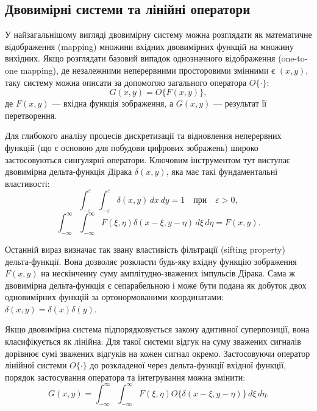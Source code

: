 \subsection{Двовимірні системи та лінійні оператори}

У найзагальнішому вигляді двовимірну систему можна розглядати як математичне відображення (mapping) множини вхідних двовимірних функцій на множину вихідних. Якщо розглядати базовий випадок однозначного відображення (one-to-one mapping), де незалежними неперервними просторовими змінними є $(x, y)$, таку систему можна описати за допомогою загального оператора $O\{\cdot\}$:
\begin{equation}
	G(x, y) = O\{F(x, y)\},
\end{equation}
де $F(x, y)$ --- вхідна функція зображення, а $G(x, y)$ --- результат її перетворення.

Для глибокого аналізу процесів дискретизації та відновлення неперервних функцій (що є основою для побудови цифрових зображень) широко застосовуються сингулярні оператори. Ключовим інструментом тут виступає двовимірна дельта-функція Дірака $\delta(x, y)$, яка має такі фундаментальні властивості:
\begin{equation}
	\int_{-\varepsilon}^{\varepsilon} \int_{-\varepsilon}^{\varepsilon} \delta(x, y) \, dx \, dy = 1 \quad \text{при} \quad \varepsilon > 0,
\end{equation}
\begin{equation}
	\int_{-\infty}^{\infty} \int_{-\infty}^{\infty} F(\xi, \eta) \delta(x - \xi, y - \eta) \, d\xi \, d\eta = F(x, y).
\end{equation}

Останній вираз визначає так звану властивість фільтрації (sifting property) дельта-функції. Вона дозволяє розкласти будь-яку вхідну функцію зображення $F(x, y)$ на нескінченну суму амплітудно-зважених імпульсів Дірака. Сама ж двовимірна дельта-функція є сепарабельною і може бути подана як добуток двох одновимірних функцій за ортонормованими координатами: $\delta(x, y) = \delta(x)\delta(y)$.

Якщо двовимірна система підпорядковується закону адитивної суперпозиції, вона класифікується як лінійна. Для такої системи відгук на суму зважених сигналів дорівнює сумі зважених відгуків на кожен сигнал окремо. Застосовуючи оператор лінійної системи $O\{\cdot\}$ до розкладеної через дельта-функції вхідної функції, порядок застосування оператора та інтегрування можна змінити:
\begin{equation}
	G(x, y) = \int_{-\infty}^{\infty} \int_{-\infty}^{\infty} F(\xi, \eta) O\{\delta(x - \xi, y - \eta)\} \, d\xi \, d\eta.
\end{equation}

